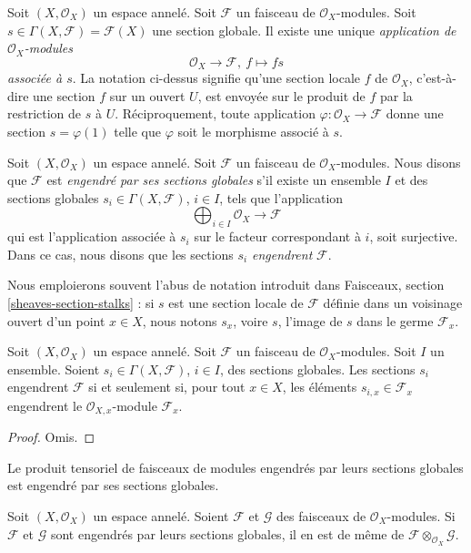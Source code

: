\noindent
Soit $(X, \mathcal{O}_X)$ un espace annelé. Soit $\mathcal{F}$ un faisceau de
$\mathcal{O}_X$-modules. Soit
$s \in \Gamma(X, \mathcal{F}) = \mathcal{F}(X)$ une section globale. Il existe
une unique {\it application de $\mathcal{O}_X$-modules}
$$
\mathcal{O}_X \longrightarrow \mathcal{F}, \ f \longmapsto fs
$$
{\it associée à $s$}. La notation ci-dessus signifie qu'une section locale
$f$ de $\mathcal{O}_X$, c'est-à-dire une section $f$ sur un ouvert $U$, est
envoyée sur le produit de $f$ par la restriction de $s$ à $U$.
Réciproquement, toute application
$\varphi : \mathcal{O}_X \to \mathcal{F}$ donne une section
$s = \varphi(1)$ telle que $\varphi$ soit le morphisme associé à $s$.

\begin{definition}
\label{definition-globally-generated}
Soit $(X, \mathcal{O}_X)$ un espace annelé. Soit $\mathcal{F}$ un faisceau de
$\mathcal{O}_X$-modules. Nous disons que $\mathcal{F}$ est {\it engendré par
ses sections globales} s'il existe un ensemble $I$ et des sections globales
$s_i \in \Gamma(X, \mathcal{F})$, $i \in I$, tels que l'application
$$
\bigoplus\nolimits_{i \in I}
\mathcal{O}_X \longrightarrow \mathcal{F}
$$
qui est l'application associée à $s_i$ sur le facteur correspondant à $i$,
soit surjective. Dans ce cas, nous disons que les sections $s_i$
{\it engendrent} $\mathcal{F}$.
\end{definition}

\noindent
Nous emploierons souvent l'abus de notation introduit dans Faisceaux,
section \ref{sheaves-section-stalks} : si $s$ est une section locale de
$\mathcal{F}$ définie dans un voisinage ouvert d'un point $x \in X$, nous
notons $s_x$, voire $s$, l'image de $s$ dans le germe $\mathcal{F}_x$.

\begin{lemma}
\label{lemma-globally-generated}
Soit $(X, \mathcal{O}_X)$ un espace annelé. Soit $\mathcal{F}$ un faisceau de
$\mathcal{O}_X$-modules. Soit $I$ un ensemble. Soient
$s_i \in \Gamma(X, \mathcal{F})$, $i \in I$, des sections globales. Les
sections $s_i$ engendrent $\mathcal{F}$ si et seulement si, pour tout
$x\in X$, les éléments $s_{i, x} \in \mathcal{F}_x$ engendrent le
$\mathcal{O}_{X, x}$-module $\mathcal{F}_x$.
\end{lemma}

\begin{proof}
Omis.
\end{proof}

\begin{lemma}
\label{lemma-tensor-product-globally-generated}
\begin{slogan}
Le produit tensoriel de faisceaux de modules engendrés par leurs sections
globales est engendré par ses sections globales.
\end{slogan}
Soit $(X, \mathcal{O}_X)$ un espace annelé. Soient $\mathcal{F}$ et
$\mathcal{G}$ des faisceaux de $\mathcal{O}_X$-modules. Si $\mathcal{F}$ et
$\mathcal{G}$ sont engendrés par leurs sections globales, il en est de même de
$\mathcal{F} \otimes_{\mathcal{O}_X} \mathcal{G}$.
\end{lemma}

